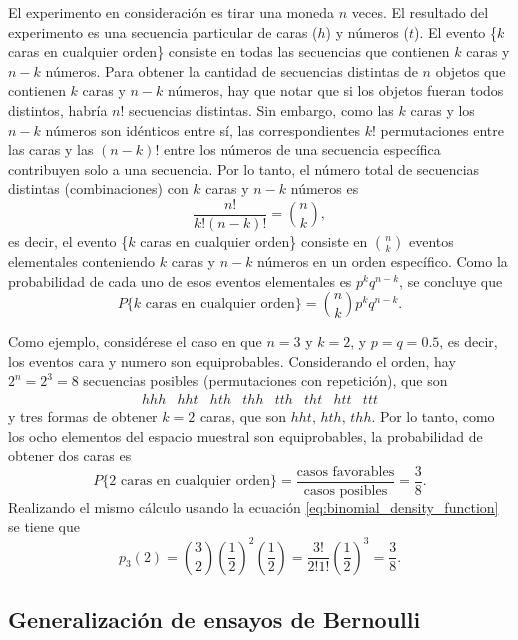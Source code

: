 \documentclass[a4paper]{report}
\begin{document}
El experimento en consideración es tirar una moneda \(n\) veces. El resultado del experimento es una secuencia particular de caras (\(h\)) y números (\(t\)). El evento \{\(k\) caras en cualquier orden\} consiste en todas las secuencias que contienen \(k\) caras y \(n-k\) números. Para obtener la cantidad de secuencias distintas de \(n\) objetos que contienen \(k\) caras y \(n-k\) números, hay que notar que si los objetos fueran todos distintos, habría \(n!\) secuencias distintas. Sin embargo, como las \(k\) caras y los \(n-k\) números son idénticos entre sí, las correspondientes \(k!\) permutaciones entre las caras y las \((n-k)!\) entre los números de una secuencia específica contribuyen solo a una secuencia. Por lo tanto, el número total de secuencias distintas (combinaciones) con \(k\) caras y \(n-k\) números es
\begin{equation}\label{eq:combinations_definition}
 \frac{n!}{k!(n-k)!}=\binom{n}{k},
\end{equation}
es decir, el evento \{\(k\) caras en cualquier orden\} consiste en \(\binom{n}{k}\) eventos elementales conteniendo \(k\) caras y \(n-k\) números en un orden específico. Como la probabilidad de cada uno de esos eventos elementales es \(p^{k}q^{n-k}\), se concluye que
\[
 P\{k\textrm{ caras en cualquier orden}\}=\binom{n}{k}p^{k}q^{n-k}.
\]

Como ejemplo, considérese el caso en que \(n=3\) y \(k=2\), y \(p=q=0.5\), es decir, los eventos cara y numero son equiprobables. Considerando el orden, hay \(2^n=2^3=8\) secuencias posibles (permutaciones con repetición), que son
\[
 \begin{array}{llllllll}
  hhh & hht & hth & thh & tth & tht & htt & ttt
 \end{array}
\]
y tres formas de obtener \(k=2\) caras, que son \( hht,\,hth,\,thh\). Por lo tanto, como los ocho elementos del espacio muestral son equiprobables, la probabilidad de obtener dos caras es
\[
 P\{2\textrm{ caras en cualquier orden}\}=\frac{\textrm{casos favorables}}{\textrm{casos posibles}}=\frac{3}{8}.
\]
Realizando el mismo cálculo usando la ecuación \ref{eq:binomial_density_function} se tiene que
\[
 p_3(2)=\binom{3}{2}\left(\frac{1}{2}\right)^2\left(\frac{1}{2}\right)=\frac{3!}{2!1!}\left(\frac{1}{2}\right)^3=\frac{3}{8}.
\]

\subsection{Generalización de ensayos de Bernoulli}
\end{document}
